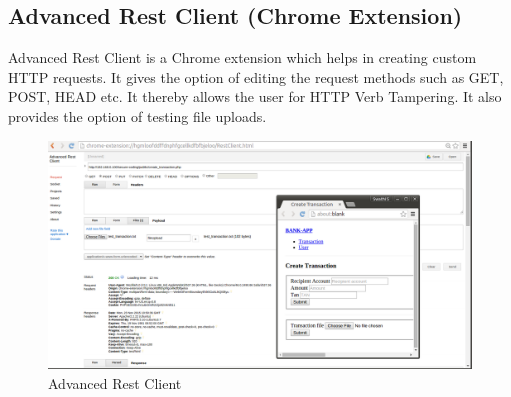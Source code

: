 \subsection{Advanced Rest Client (Chrome Extension)}
Advanced Rest Client is a Chrome extension which helps in creating custom HTTP requests. It gives the option of editing the request methods such as GET, POST, HEAD etc. It thereby allows the user for HTTP Verb Tampering. It also provides the option of testing file uploads. \\
\begin{figure}[ht]
	\centering
	\includegraphics[width=.8\linewidth]{figures/tool_advanced_rest_client.png}
	\caption{Advanced Rest Client}
	\label{fig:tool_advanced_rest_client}
\end{figure}